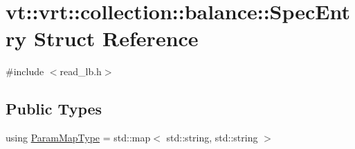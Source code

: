 \hypertarget{structvt_1_1vrt_1_1collection_1_1balance_1_1_spec_entry}{}\section{vt\+:\+:vrt\+:\+:collection\+:\+:balance\+:\+:Spec\+Entry Struct Reference}
\label{structvt_1_1vrt_1_1collection_1_1balance_1_1_spec_entry}


{\ttfamily \#include $<$read\+\_\+lb.\+h$>$}

\subsection*{Public Types}
\begin{DoxyCompactItemize}
\item 
using \hyperlink{structvt_1_1vrt_1_1collection_1_1balance_1_1_spec_entry_a2ec68beff648a236f7f527dc5deeb4c5}{Param\+Map\+Type} = std\+::map$<$ std\+::string, std\+::string $>$
\end{DoxyCompactItemize}
